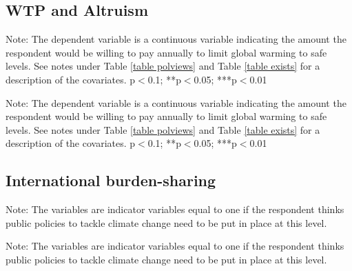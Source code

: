 \documentclass{article}
\begin{document}
\clearpage
\subsection{WTP and Altruism}



\begin{table}[h!]
	\caption{Willingness to Pay}
	\begin{center}
		\scalebox{0.7}{}
	\end{center}
	{\footnotesize Note: The dependent variable is a continuous variable indicating the amount the respondent would be willing to pay annually to limit global warming to safe levels. See notes under Table \ref{table polviews} and Table \ref{table exists} for a description of the covariates.
	\newline *p$<$0.1; **p$<$0.05; ***p$<$0.01}
\end{table}	

\begin{table}[h!]
	\caption{Altruism}
	\begin{center}
		\scalebox{0.7}{}
	\end{center}
	{\footnotesize Note: The dependent variable is a continuous variable indicating the amount the respondent would be willing to pay annually to limit global warming to safe levels. See notes under Table \ref{table polviews} and Table \ref{table exists} for a description of the covariates.
	\newline *p$<$0.1; **p$<$0.05; ***p$<$0.01}
\end{table}	



\clearpage
\subsection{International burden-sharing}



\begin{table}[h!]
	\caption{Best level to implement policies to tackle climate change}
	\begin{center}
		\scalebox{0.7}{}
	\end{center}
	{\footnotesize Note: The variables are indicator variables equal to one if the respondent thinks public policies to tackle climate change need to be put in place at this level.}
\end{table}	

\begin{table}[h!]
	\caption{How should the U.S. act}
	\begin{center}
		\scalebox{0.7}{}
	\end{center}
	{\footnotesize Note: The variables are indicator variables equal to one if the respondent thinks public policies to tackle climate change need to be put in place at this level.}
\end{table}	
\end{document}
